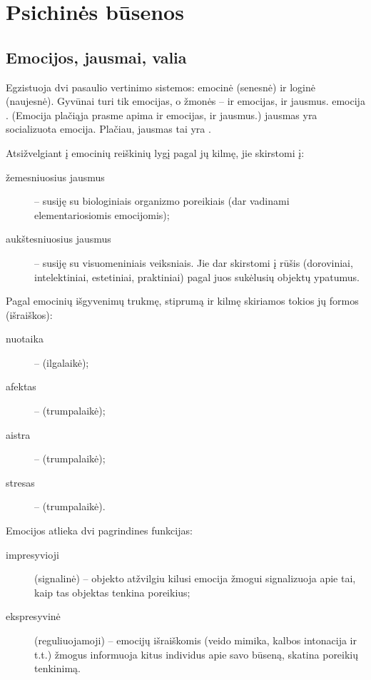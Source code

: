 \chapter{Psichinės būsenos}

\label{tema:psichines_busenos}

\section{Emocijos, jausmai, valia}

Egzistuoja dvi pasaulio vertinimo sistemos: emocinė (senesnė) ir loginė 
(naujesnė). Gyvūnai turi tik emocijas, o žmonės – ir emocijas, ir jausmus. 
\Gls{emocija} . (Emocija plačiąja prasme apima
ir emocijas, ir jausmus.) \Gls{jausmas} yra socializuota 
\gls{emocija}. Plačiau, \gls{jausmas} tai yra .

\label{tema:emocijos}
Atsižvelgiant į emocinių reiškinių lygį pagal jų kilmę, jie skirstomi į:
\begin{description}
  \item[žemesniuosius jausmus] – susiję su biologiniais organizmo 
    poreikiais (dar vadinami elementariosiomis emocijomis);
  \item[aukštesniuosius jausmus] – susiję su visuomeniniais veiksniais.
    Jie dar skirstomi į rūšis (doroviniai, intelektiniai, estetiniai,
    praktiniai) pagal juos sukėlusių objektų ypatumus.
\end{description}

Pagal emocinių išgyvenimų trukmę, stiprumą ir kilmę skiriamos tokios
jų formos (išraiškos):
\begin{description}
  \item[\gls{nuotaika}] –  (ilgalaikė);
  \item[\gls{afektas}] –  (trumpalaikė);
  \item[\gls{aistra}] –  (trumpalaikė);
  \item[\gls{stresas}] –  (trumpalaikė).
\end{description}

Emocijos atlieka dvi pagrindines funkcijas:
\begin{description}
  \item[impresyvioji] (signalinė) – objekto atžvilgiu kilusi emocija
    žmogui signalizuoja apie tai, kaip tas objektas tenkina poreikius;
  \item[ekspresyvinė] (reguliuojamoji) – emocijų išraiškomis (veido
    mimika, kalbos intonacija ir t.t.) žmogus informuoja kitus individus 
    apie savo būseną, skatina poreikių tenkinimą.
\end{description}

